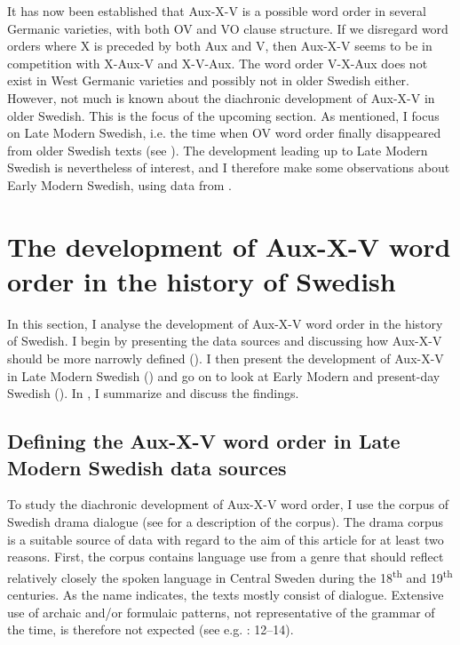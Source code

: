 \documentclass[output=paper, colorlinks, citecolor=brown]{langscibook}
\begin{document}
It has now been established that Aux-X-V is a possible word order in several Germanic varieties, with both OV and VO clause structure. If we disregard word orders where X is preceded by both Aux and V, then Aux-X-V seems to be in competition with X-Aux-V and X-V-Aux. The word order V-X-Aux does not exist in West Germanic varieties and possibly not in older Swedish either. However, not much is known about the diachronic development of Aux-X-V in older Swedish. This is the focus of the upcoming section. As mentioned, I focus on Late Modern Swedish, i.e. the time when OV word order finally disappeared from older Swedish texts (see \citealt{Platzack1983,Petzell2011,Sangfelt2019}). The development leading up to Late Modern Swedish is nevertheless of interest, and I therefore make some observations about Early Modern Swedish, using data from \citet{Sangfelt2019}.

\section{The development of Aux-X-V word order in the history of Swedish}\label{sec:sangfelt:4}

In this section, I analyse the development of Aux-X-V word order in the history of Swedish. I begin by presenting the data sources and discussing how Aux-X-V should be more narrowly defined (). I then present the development of Aux-X-V in Late Modern Swedish () and go on to look at Early Modern and present-day Swedish (). In , I summarize and discuss the findings.

\subsection{Defining the Aux-X-V word order in Late Modern Swedish data sources}\label{sec:sangfelt:4.1}

To study the diachronic development of Aux-X-V word order, I use the corpus of Swedish drama dialogue (see \citealt{MarttalaStromquist2001} for a description of the corpus). The drama corpus is a suitable source of data with regard to the aim of this article for at least two reasons. First, the corpus contains language use from a genre that should reflect relatively closely the spoken language in Central Sweden during the 18\textsuperscript{th} and 19\textsuperscript{th} centuries. As the name indicates, the texts mostly consist of dialogue. Extensive use of archaic and/or formulaic patterns, not representative of the grammar of the time, is therefore not expected (see e.g. \citealt{Fischer2007}: 12–14).
\end{document}
